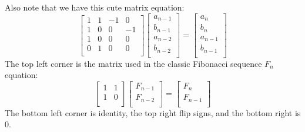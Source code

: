 Also note that we have this cute matrix equation:
\[\begin{bmatrix}
	1&1&-1&0\\
	1&0&0&-1\\
	1&0&0&0\\
	0&1&0&0\\
\end{bmatrix}
\begin{bmatrix}
	a_{n-1}\\b_{n-1}\\a_{n-2}\\b_{n-2}\\
\end{bmatrix}
=
\begin{bmatrix}
	a_n\\b_n\\a_{n-1}\\b_{n-1}\\
\end{bmatrix}\]
The top left corner is the matrix used in the classic Fibonacci sequence $F_n$ equation:
\[\begin{bmatrix}
	1&1\\
	1&0\\
\end{bmatrix}
\begin{bmatrix}
	F_{n-1}\\F_{n-2}\\
\end{bmatrix}
=
\begin{bmatrix}
	F_n\\F_{n-1}\\
\end{bmatrix}\]
The bottom left corner is identity, the top right flip signs, and the bottom right is $0$.
